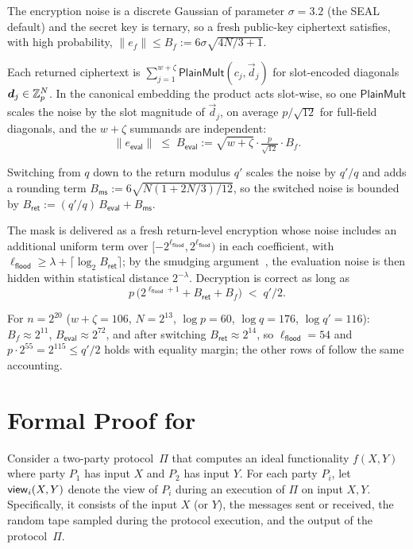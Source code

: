 The encryption noise is a discrete Gaussian of parameter $\sigma=3.2$ (the SEAL default) and the secret key is ternary, so a fresh public-key ciphertext satisfies, with high probability, $\|e_f\| \le B_f := 6\sigma\sqrt{4N/3+1}$.

Each returned ciphertext is $\sum_{j=1}^{w+\zeta}\mathsf{PlainMult}(c_j,\vec d_j)$ for slot-encoded diagonals $\bm{d}_j\in\mathbb{Z}_p^N$. In the canonical embedding the product acts slot-wise, so one $\mathsf{PlainMult}$ scales the noise by the slot magnitude of $\vec d_j$, on average $p/\sqrt{12}$ for full-field diagonals, and the $w+\zeta$ summands are independent:
\[
  \|e_{\mathsf{eval}}\| \;\le\; B_{\mathsf{eval}} := \sqrt{w+\zeta}\cdot\tfrac{p}{\sqrt{12}}\cdot B_f .
\]

Switching from $q$ down to the return modulus $q'$ scales the noise by $q'/q$ and adds a rounding term $B_{\mathsf{ms}} := 6\sqrt{N(1+2N/3)/12}$, so the switched noise is bounded by $B_{\mathsf{ret}} := (q'/q)\,B_{\mathsf{eval}} + B_{\mathsf{ms}}$.

The mask is delivered as a fresh return-level encryption whose noise includes an additional uniform term over $[-2^{\ell_{\mathsf{flood}}},2^{\ell_{\mathsf{flood}}})$ in each coefficient, with $\ell_{\mathsf{flood}} \ge \lambda + \lceil\log_2 B_{\mathsf{ret}}\rceil$; by the smudging argument~\cite{AJLA+12}, the evaluation noise is then hidden within statistical distance $2^{-\lambda}$. Decryption is correct as long as
\[
  p\,\bigl(2^{\ell_{\mathsf{flood}}+1} + B_{\mathsf{ret}} + B_f\bigr) \;<\; q'/2 .
\]

For $n=2^{20}$ ($w+\zeta=106$, $N=2^{13}$, $\log p=60$, $\log q=176$, $\log q'=116$): $B_f\approx 2^{11}$, $B_{\mathsf{eval}}\approx 2^{72}$, and after switching $B_{\mathsf{ret}}\approx 2^{14}$, so $\ell_{\mathsf{flood}} = 54$ and $p\cdot 2^{55} = 2^{115} \le q'/2$ holds with equality margin; the other rows of  follow the same accounting.

\section{Formal Proof for }\label{sec:security_proof}
Consider a two-party protocol~$\Pi$ that computes an ideal functionality $f(X, Y)$ where party $P_1$ has input $X$ and $P_2$ has input $Y$.
For each party $P_i$, let ${\sf view}_i(X, Y)$ denote the view of $P_i$ during an execution of $\Pi$ on input $X, Y$.
Specifically, it consists of the input $X$ (or $Y$), the messages sent or received, the random tape sampled during the protocol execution, and the output of the protocol~$\Pi$.


